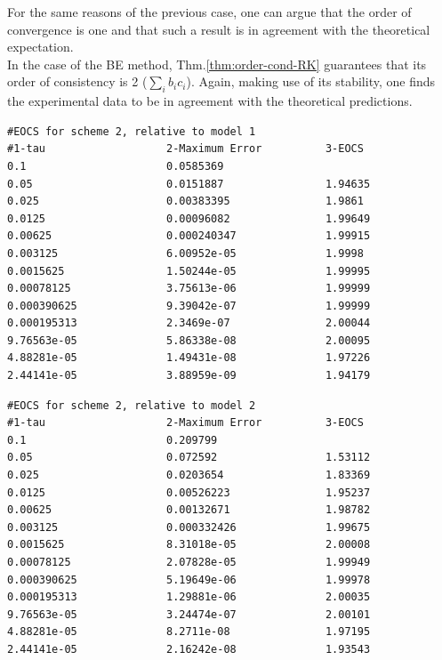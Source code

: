 \documentclass[11pt]{article}
\theoremstyle{theorem}
\theoremstyle{definition}
\begin{document}
For the same reasons of the previous case, one can argue that the order of convergence is one and that such a result is in agreement with the theoretical expectation.\\

In the case of the BE method, Thm.\ref{thm:order-cond-RK} guarantees that its order of consistency is 2 ($\sum_i b_ic_i$). Again, making use of its stability, one finds the experimental data to be in agreement with the theoretical predictions.\\

\begin{lstlisting}
#EOCS for scheme 2, relative to model 1
#1-tau                   2-Maximum Error          3-EOCS                   
0.1                      0.0585369                	
0.05                     0.0151887                1.94635
0.025                    0.00383395               1.9861
0.0125                   0.00096082               1.99649
0.00625                  0.000240347              1.99915
0.003125                 6.00952e-05              1.9998
0.0015625                1.50244e-05              1.99995
0.00078125               3.75613e-06              1.99999
0.000390625              9.39042e-07              1.99999
0.000195313              2.3469e-07               2.00044
9.76563e-05              5.86338e-08              2.00095
4.88281e-05              1.49431e-08              1.97226
2.44141e-05              3.88959e-09              1.94179
\end{lstlisting}

\begin{lstlisting}
#EOCS for scheme 2, relative to model 2
#1-tau                   2-Maximum Error          3-EOCS                   
0.1                      0.209799                 	
0.05                     0.072592                 1.53112
0.025                    0.0203654                1.83369
0.0125                   0.00526223               1.95237
0.00625                  0.00132671               1.98782
0.003125                 0.000332426              1.99675
0.0015625                8.31018e-05              2.00008
0.00078125               2.07828e-05              1.99949
0.000390625              5.19649e-06              1.99978
0.000195313              1.29881e-06              2.00035
9.76563e-05              3.24474e-07              2.00101
4.88281e-05              8.2711e-08               1.97195
2.44141e-05              2.16242e-08              1.93543
\end{lstlisting}
\end{document}
